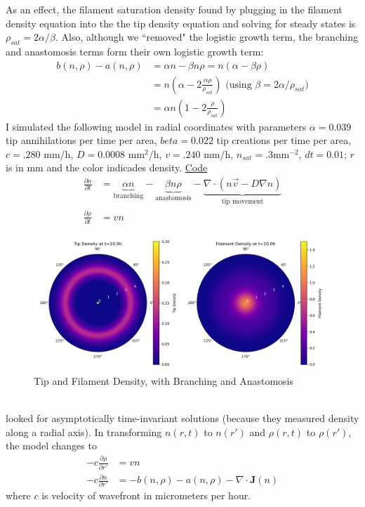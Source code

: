 \documentclass{article}
\begin{document}
As an effect, the filament saturation density found by plugging in the filament density equation into the the tip density equation and solving for steady states is  $\rho_{sat} = 2\alpha/\beta$.
Also, although we ``removed" the logistic growth term, the branching and anastomosis terms form their own logistic growth term:
\begin{align*}
    b(n, \rho) - a(n, \rho) & = \alpha n - \beta n \rho  = n(\alpha - \beta \rho) \\
    & = n(\alpha - 2\frac{\alpha\rho}{\rho_{sat}}) \text{\ \ (using $\beta = 2\alpha/\rho_{sat}$)}\\
    & = \alpha n(1 - 2\frac{\rho}{\rho_{sat}})
\end{align*}
I simulated the following model in radial coordinates with parameters $\alpha = 0.039$ tip annihilations per time per area, $beta = 0.022$ tip creations per time per area, $c = .280$ mm/h, $D = 0.0008$ mm$^2$/h, $v = .240$ mm/h, $n_{sat} = .3$mm$^{-2}$, $dt = 0.01$; $r$ is in mm and the color indicades density. \hyperlink{BA}{Code}
\begin{align*}
    \frac{\partial n}{\partial t}
    &= \underbrace{\alpha n}_{\text{branching}} - \underbrace{\beta n \rho}_{\text{anastomosis}} -\underbrace{\nabla \cdot ( n\vec{v} -D\nabla n)}_{\text{tip movement}} \\
    \frac{\partial\rho}{\partial t} &= vn
\end{align*}
\begin{figure}[h]
    \centering
    \includegraphics[width=0.9\linewidth]{withBandA.png}
    \caption{Tip and Filament Density, with Branching and Anastomosis}
    \label{fig:enter-label}
\end{figure}\\

\cite{Oyarte2025travelling} looked for asymptotically time-invariant solutions (because they measured density along a radial axis).  
In transforming $n(r,t)$ to $n(r')$ and $\rho(r,t)$ to $\rho(r')$, the model changes to 
\begin{align*}
    -c\frac{\partial\rho}{\partial r'} & = vn \\
    -c\frac{\partial n}{\partial r'} & = -b(n,\rho) - a(n,\rho) - \nabla\cdot\mathbf{J}(n) 
\end{align*}
where $c$ is velocity of wavefront in micrometers per hour.
\end{document}
